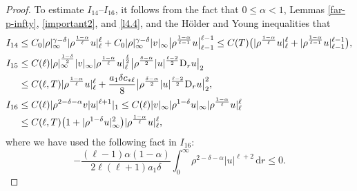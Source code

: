 \documentclass[11pt,reqno]{amsart}
\numberwithin{rk}{section}
\numberwithin{prop}{section}
\numberwithin{mydef}{section}
\numberwithin{lem}{section}
\numberwithin{equation}{section}
\numberwithin{thm}{section}
\begin{document}
\begin{proof}
To estimate $I_{14}$--$I_{16}$, it follows from the fact that $0\leq \alpha<1$, Lemmas \ref{far-p-infty}, \ref{important2}, and \ref{l4.4}, and the H\"older and Young inequalities that
\begin{align}
&\begin{aligned}[b]
I_{14}&\leq C_0|\rho|_\infty^{\gamma-\delta}|\rho^\frac{1-\alpha}{\ell}u|_\ell^\ell+C_0|\rho|_\infty^{\gamma-\delta}|v|_\infty\big|\rho^\frac{1-\alpha}{\ell-1}u\big|_{\ell-1}^{\ell-1}\leq C(T)\big(|\rho^\frac{1-\alpha}{\ell}u|_\ell^\ell+|\rho^\frac{1-\alpha}{\ell-1}u|_{\ell-1}^{\ell-1}\big),\\
I_{15}&\leq C(\ell)|\rho|_\infty^\frac{1-\delta}{2}|v|_\infty|\rho^\frac{1-\alpha}{\ell}u|_\ell^\frac{\ell}{2}\big|\rho^\frac{\delta-\alpha}{2}|u|^\frac{\ell-2}{2}\mathrm{D}_r u\big|_2\\
&\leq C(\ell,T)|\rho^\frac{1-\alpha}{\ell}u|_\ell^\ell+\frac{a_1 \delta c_{*\ell}}{8}\big|\rho^\frac{\delta-\alpha}{2}|u|^\frac{\ell-2}{2}\mathrm{D}_r u\big|_2^2,
\end{aligned}\label{6.8}\\
&\begin{aligned}
I_{16}&\leq C(\ell)|\rho^{2-\delta-\alpha}v|u|^{\ell+1}|_1\leq C(\ell)|v|_\infty|\rho^{1-\delta}u|_\infty |\rho^\frac{1-\alpha}{\ell}u|_\ell^\ell \\
&\leq C(\ell,T)\big(1+|\rho^{1-\delta}u|_\infty^2\big) |\rho^\frac{1-\alpha}{\ell}u|_\ell^\ell,\notag
\end{aligned}
\end{align}
where we have used the following fact in $I_{16}$:
\begin{equation*}
-\frac{(\ell-1)\alpha(1-\alpha)}{2\ell(\ell+1)a_1\delta}\int_0^\infty\rho^{2-\delta-\alpha}|u|^{\ell+2}\,\mathrm{d}r\leq 0.
\end{equation*}


\end{proof}
\end{document}
